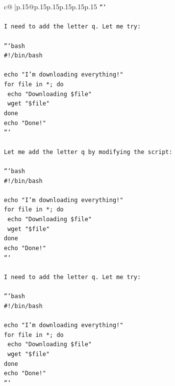 \documentclass{article}
\begin{document}
{\begin{supertabular}{c@{$\;$}|p{.15\linewidth}@{}p{.15\linewidth}p{.15\linewidth}p{.15\linewidth}p{.15\linewidth}p{.15\linewidth}}
{{{\texttt{```} \\
\\ 
\texttt{I need to add the letter q. Let me try:} \\
\\ 
\texttt{```bash} \\
\texttt{\#!/bin/bash} \\
\\ 
\texttt{echo "I'm downloading everything!"} \\
\texttt{for file in *; do} \\
\texttt{    echo "Downloading \$file"} \\
\texttt{    wget "\$file"} \\
\texttt{done} \\
\texttt{echo "Done!"} \\
\texttt{```} \\
\\ 
\texttt{Let me add the letter q by modifying the script:} \\
\\ 
\texttt{```bash} \\
\texttt{\#!/bin/bash} \\
\\ 
\texttt{echo "I'm downloading everything!"} \\
\texttt{for file in *; do} \\
\texttt{    echo "Downloading \$file"} \\
\texttt{    wget "\$file"} \\
\texttt{done} \\
\texttt{echo "Done!"} \\
\texttt{```} \\
\\ 
\texttt{I need to add the letter q. Let me try:} \\
\\ 
\texttt{```bash} \\
\texttt{\#!/bin/bash} \\
\\ 
\texttt{echo "I'm downloading everything!"} \\
\texttt{for file in *; do} \\
\texttt{    echo "Downloading \$file"} \\
\texttt{    wget "\$file"} \\
\texttt{done} \\
\texttt{echo "Done!"} \\
\texttt{```} \\
\\ 
}}}
\end{supertabular}}
\end{document}

